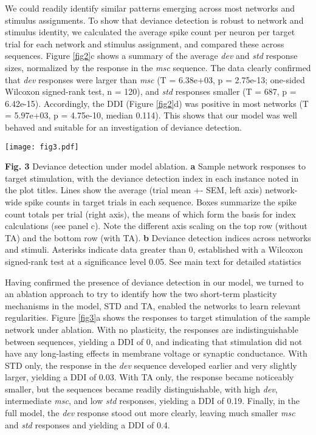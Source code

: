 \documentclass[pdflatex,referee,iicol,sn-basic]{sn-jnl}
\newcommand{\dev}{\textit{dev}}
\newcommand{\msc}{\textit{msc}}
\newcommand{\std}{\textit{std}}
\newcommand{\refpanel}[2]{Figure \ref{fig#1}\lowercase{#2}}
\begin{document}
We could readily identify similar patterns emerging across most networks and stimulus assignments. To show that deviance detection is robust to network and stimulus identity, we calculated the average spike count per neuron per target trial for each network and stimulus assignment, and compared these across sequences. \refpanel{2}{c} shows a summary of the average \dev{} and \std{} response sizes, normalized by the response in the \msc{} sequence. The data clearly confirmed that \dev{} responses were larger than \msc{} (T = 6.38e+03, p = 2.75e-13; one-sided Wilcoxon signed-rank test, n = 120), and \std{} responses smaller (T = 687, p = 6.42e-15). Accordingly, the DDI (\refpanel{2}{d}) was positive in most networks (T = 5.97e+03, p = 4.75e-10, median 0.114). This shows that our model was well behaved and suitable for an investigation of deviance detection.

\begin{figure*}%
    \centering
    \texttt{[image: fig3.pdf]}
    \caption{}
    \label{fig3}
\end{figure*}
\textbf{Fig. 3} Deviance detection under model ablation.
\textbf{a} Sample network responses to target stimulation, with the deviance detection index in each instance noted in the plot titles. Lines show the average (trial mean +- SEM, left axis) network-wide spike counts in target trials in each sequence. Boxes summarize the spike count totals per trial (right axis), the means of which form the basis for index calculations (see panel c). Note the different axis scaling on the top row (without TA) and the bottom row (with TA).
\textbf{b} Deviance detection indices across networks and stimuli. Asterisks indicate data greater than 0, established with a Wilcoxon signed-rank test at a significance level 0.05. See main text for detailed statistics

Having confirmed the presence of deviance detection in our model, we turned to an ablation approach to try to identify how the two short-term plasticity mechanisms in the model, STD and TA, enabled the networks to learn relevant regularities. \refpanel{3}{a} shows the responses to target stimulation of the sample network under ablation. With no plasticity, the responses are indistinguishable between sequences, yielding a DDI of 0, and indicating that stimulation did not have any long-lasting effects in membrane voltage or synaptic conductance. With STD only, the response in the \dev{} sequence developed earlier and very slightly larger, yielding a DDI of 0.03. With TA only, the response became noticeably smaller, but the sequences became readily distinguishable, with high \dev{}, intermediate \msc{}, and low \std{} responses, yielding a DDI of 0.19. Finally, in the full model, the \dev{} response stood out more clearly, leaving much smaller \msc{} and \std{} responses and yielding a DDI of 0.4.
\end{document}
